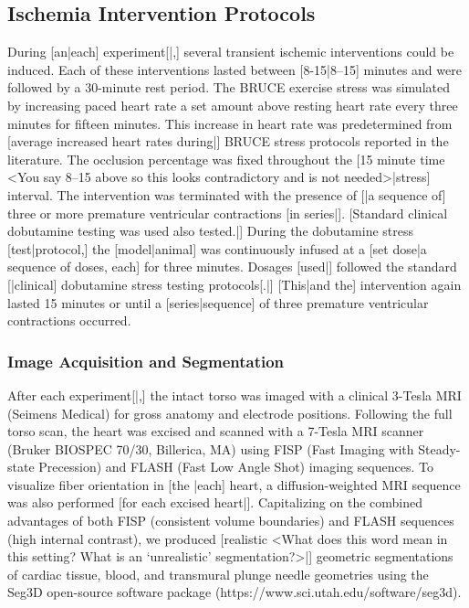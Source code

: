 \documentclass[twocolumn]{cinc}
\begin{document}
\subsection{Ischemia Intervention Protocols}

During [an|each] experiment[|,] several transient ischemic interventions
could be induced. Each of these interventions lasted between [8-15|8--15]
minutes and were followed by a 30-minute rest period. The BRUCE exercise
stress was simulated by increasing paced heart rate a set amount above
resting heart rate every three minutes for fifteen minutes. This increase
in heart rate was predetermined from [average increased heart rates
during|] BRUCE stress protocols reported in the
literature. \cite{Okin1986a} The occlusion percentage was fixed throughout
the [15 minute time <You say 8--15 above so this looks contradictory and is
not needed>|stress] interval. The intervention was terminated with the
presence of [|a sequence of] three or more premature ventricular
contractions [in series|]. [Standard clinical dobutamine testing was used
also tested.|] During the dobutamine stress [test|protocol,] the
[model|animal] was continuously infused at a [set dose|a sequence of doses,
each] for three minutes. Dosages [used|] followed the standard [|clinical]
dobutamine stress testing protocols[.|] \cite{Secknus1997} [This|and the]
intervention again lasted 15 minutes or until a [series|sequence] of three
premature ventricular contractions occurred.

\subsubsection{Image Acquisition and Segmentation}

After each experiment[|,] the intact torso was imaged with a clinical
3-Tesla MRI (Seimens Medical) for gross anatomy and electrode
positions. Following the full torso scan, the heart was excised and scanned
with a 7-Tesla MRI scanner (Bruker BIOSPEC 70/30, Billerica, MA) using FISP
(Fast Imaging with Steady-state Precession) and FLASH (Fast Low Angle Shot)
imaging sequences. To visualize fiber orientation in [the |each] heart, a
diffusion-weighted MRI sequence was also performed [for each excised
heart|]. Capitalizing on the combined advantages of both FISP (consistent
volume boundaries) and FLASH sequences (high internal contrast), we
produced [realistic <What does this word mean in this setting?  What is an
`unrealistic' segmentation?>|] geometric segmentations of cardiac tissue,
blood, and transmural plunge needle geometries using the Seg3D open-source
software package (https://www.sci.utah.edu/software/seg3d).
\end{document}
